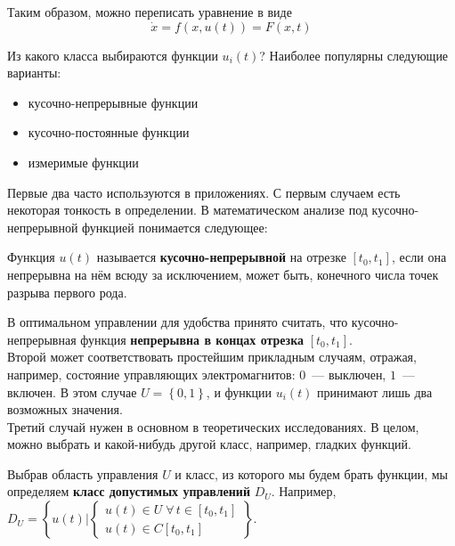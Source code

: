 Таким образом, можно переписать уравнение в виде 
\begin{equation}
    \dot{x} = f(x, u(t)) = F(x, t)
\end{equation}

Из какого класса выбираются функции $u_i(t)$?
Наиболее популярны следующие варианты:
\begin{itemize}
    \item кусочно-непрерывные функции
    \item кусочно-постоянные функции
    \item измеримые функции
\end{itemize}
Первые два часто используются в приложениях.
С первым случаем есть некоторая тонкость в определении.
В математическом анализе под кусочно-непрерывной функцией понимается следующее:
\begin{defn}
    Функция $u(t)$ называется \textbf{кусочно-непрерывной} на отрезке $[t_0, t_1]$, 
    если она непрерывна на нём всюду за исключением, может быть, конечного числа точек разрыва первого рода.
\end{defn}
В оптимальном управлении для удобства принято считать, что кусочно-непрерывная функция \textbf{непрерывна в концах отрезка} $[t_0, t_1]$. \\
Второй может соответствовать простейшим прикладным случаям, отражая, например, состояние управляющих электромагнитов: $0$~--- выключен, $1$~--- включен.
В этом случае $U = \left\{0, 1\right\}$, и функции $u_i(t)$ принимают лишь два возможных значения. \\
Третий случай нужен в основном в теоретических исследованиях.
В целом, можно выбрать и какой-нибудь другой класс, например, гладких функций.

Выбрав область управления $U$ и класс, из которого мы будем брать функции, мы определяем \textbf{класс допустимых управлений} $D_U$.
Например, $D_U = \left\{ u(t) \biggl| \begin{cases} u(t) \in U \; \forall \, t \in [t_0, t_1]\\ u(t) \in C[t_0, t_1]\end{cases} \right\}$.

